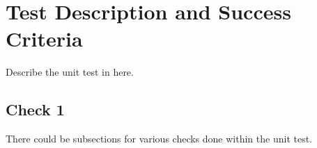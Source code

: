 \section{Test Description and Success Criteria}
Describe the unit test in here.

\subsection{Check 1}
There could be subsections for various checks done within the unit test.